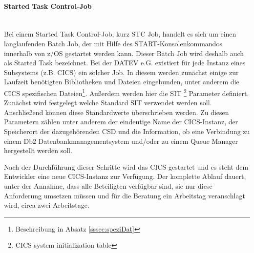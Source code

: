 \paragraph{Started Task Control-Job} ~\\
Bei einem Started Task Control-Job, kurz STC Job, handelt es sich um einen langlaufenden Batch Job, der mit Hilfe des \glqq START\grqq-Konsolenkommandos innerhalb von z/OS gestartet werden kann.
Dieser Batch Job wird deshalb auch als Started Task bezeichnet.\cite[S. 224]{Cassier.2007}
Bei der DATEV e.G. existiert für jede Instanz eines Subsystems (z.B. CICS) ein solcher Job.
In diesem werden zunächst einige zur Laufzeit benötigten Bibliotheken und Dateien eingebunden, unter anderem die CICS spezifischen Dateien\footnote{Beschreibung in Absatz \ref{sssec:speziDat}}.
Außerdem werden hier die SIT \footnote{CICS system initialization table} Parameter definiert.
Zunächst wird festgelegt welche Standard SIT verwendet werden soll.
Anschließend können diese Standardwerte überschrieben werden.
Zu diesen Parametern zählen unter anderem der eindeutige Name der CICS-Instanz, der Speicherort der dazugehörenden CSD und die Information, ob eine Verbindung zu einem Db2 Datenbankmanagementsystem und/oder zu einem Queue Manager hergestellt werden soll.

Nach der Durchführung dieser Schritte wird das CICS gestartet und es steht dem Entwickler eine neue CICS-Instanz zur Verfügung.
Der komplette Ablauf dauert, unter der Annahme, dass alle Beteiligten verfügbar sind, sie nur diese Anforderung umsetzen müssen und für die Beratung ein Arbeitstag veranschlagt wird, circa zwei Arbeitstage.

